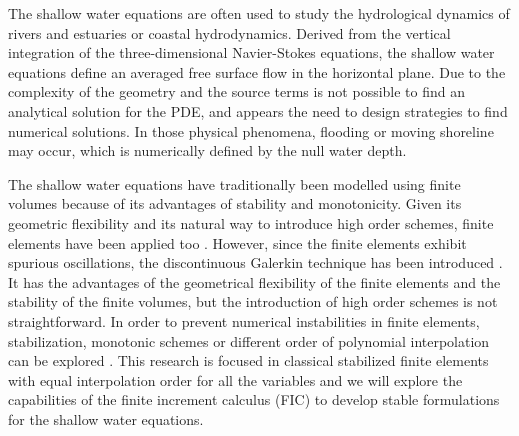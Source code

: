 \documentclass[a4paper,12pt]{article}
\newcommand\Ignasi[1]{\ifthenelse{\boolean{show_comments}}{\textcolor{blue}{#1}}{}}
\begin{document}
The shallow water equations are often used to study the hydrological dynamics of rivers and estuaries or coastal hydrodynamics.
Derived from the vertical integration of the three-dimensional Navier-Stokes equations, the shallow water equations define an averaged free surface flow in the horizontal plane.
Due to the complexity of the geometry and the source terms is not possible to find an analytical solution for the PDE, and appears the need to design strategies to find numerical solutions.
In those physical phenomena, flooding or moving shoreline may occur, which is numerically defined by the null water depth.

The shallow water equations have traditionally been modelled using finite volumes because of its advantages of stability and monotonicity. Given its geometric flexibility and its natural way to introduce high order schemes, finite elements have been applied too \cite{zien3,navon1979,navon1988}.
However, since the finite elements exhibit spurious oscillations, the discontinuous Galerkin technique has been introduced \cite{ambati2007,khan2014,lee2019}.
It has the advantages of the geometrical flexibility of the finite elements and the stability of the finite volumes, but the introduction of high order schemes is not straightforward.
In order to prevent numerical instabilities in finite elements, stabilization, monotonic schemes or different order of polynomial interpolation can be explored \cite{hood1974,zien3,ortiz2012}.
This research is focused in classical stabilized finite elements with equal interpolation order for all the variables and we will explore the capabilities of the finite increment calculus (FIC) to develop stable formulations for the shallow water equations.
\end{document}
